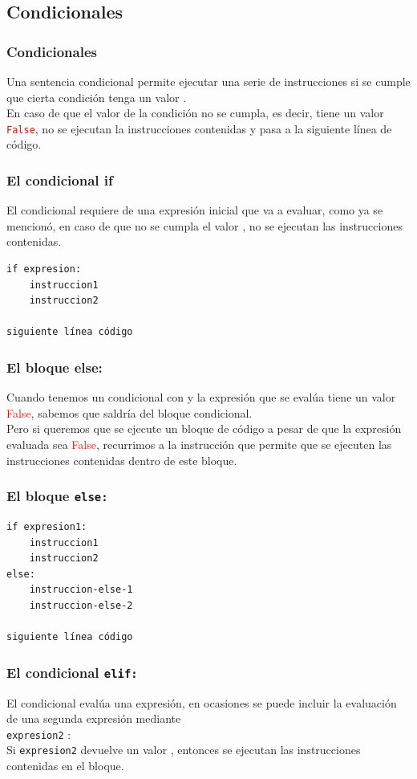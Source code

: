 \subsection{Condicionales}
\begin{frame}
\frametitle{Condicionales}
Una sentencia condicional permite ejecutar una serie de instrucciones si se cumple que cierta condición tenga un valor .
\\
\bigskip
En caso de que el valor de la condición no se cumpla, es decir, tiene un valor \textcolor{red}{\texttt{False}}, no se ejecutan la instrucciones contenidas y pasa a la siguiente línea de código.
\end{frame}
\begin{frame}[fragile]
\frametitle{El condicional if}
El condicional  requiere de una expresión inicial que va a evaluar, como ya se mencionó, en caso de que no se cumpla el valor , no se ejecutan las instrucciones contenidas.
\begin{verbatim}
if expresion:
    instruccion1
    instruccion2

siguiente línea código
\end{verbatim}
\end{frame}
\begin{frame}
\frametitle{El bloque else:}
Cuando tenemos un condicional con  y la  expresión que se evalúa tiene un valor \textcolor{red}{False}, sabemos que saldría del bloque condicional.
\\
\bigskip
Pero si queremos que se ejecute un bloque de código a pesar de que la expresión evaluada sea \textcolor{red}{False}, recurrimos a la instrucción  que permite que se ejecuten las instrucciones contenidas dentro de este bloque.
\end{frame}
\begin{frame}[fragile]
\frametitle{El bloque \texttt{else:}}
\begin{verbatim}
if expresion1:
    instruccion1
    instruccion2
else:
    instruccion-else-1
    instruccion-else-2

siguiente línea código
\end{verbatim}
\end{frame}
\begin{frame}
\frametitle{El condicional \texttt{elif:}}
El condicional  evalúa una expresión, en ocasiones se puede incluir la evaluación de una segunda expresión mediante
\\
\bigskip
{} \texttt{expresion2} :
\\
\bigskip
Si \texttt{expresion2} devuelve un valor , entonces se ejecutan las instrucciones contenidas en el bloque.
\end{frame}
